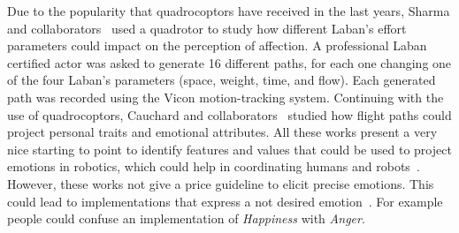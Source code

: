 Due to the popularity that quadrocoptors have received in the last years, Sharma and collaborators~\cite{Sharma2013} used a quadrotor to study how different Laban's effort~\cite{Laban1968} parameters could impact on the perception of affection. A professional Laban certified actor was asked to generate 16 different paths, for each one changing one of the four Laban's parameters (space, weight, time, and flow). Each generated path was recorded using the Vicon motion-tracking system. Continuing with the use of quadrocoptors, Cauchard and collaborators~\cite{Cauchard2016} studied how flight paths could project personal traits and emotional attributes. All these works present a very nice starting to point to identify features and values that could be used to project emotions in robotics, which could help in coordinating humans and robots~\cite{Novika2015}. However, these works not give a price guideline to elicit precise emotions. This could lead to implementations that express a not desired emotion~\cite{Angel2016}. For example people could confuse an implementation of \textit{Happiness} with \textit{Anger}.
